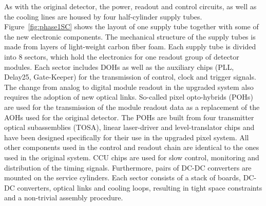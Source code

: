 As with the original detector, the power, readout and control circuits, as well as the cooling lines are housed by four half-cylinder supply tubes.
Figure~\ref{fig:phase1SC} shows the layout of one supply tube together with some of the new electronic components.
The mechanical structure of the supply tubes is made from layers of light-weight carbon fiber foam. Each supply tube is divided into 8 sectors, which hold the electronics for one readout group of detector modules.
Each sector includes DOHs as well as the auxiliary chips (PLL, Delay25, Gate-Keeper) for the transmission of control, clock and trigger signals.
The change from analog to digital module readout in the upgraded system also requires the adoption of new optical links.
So-called pixel opto-hybrids (POHs)~\cite{1748-0221-7-01-C01113} are used for the transmission of the module readout data as a replacement of the AOHs used for the original detector.
The POHs are built from four transmitter optical subassemblies (TOSA), linear laser-driver and level-translator chips and have been designed specifically for their use in the upgraded pixel system.
All other components used in the control and readout chain are identical to the ones used in the original system. CCU chips are used for slow control, monitoring and distribution of the timing signals.
Furthermore, pairs of DC-DC converters are mounted on the service cylinders.
Each sector consists of a stack of boards, DC-DC converters, optical links and cooling loops, resulting in tight space constraints and a non-trivial assembly procedure.

